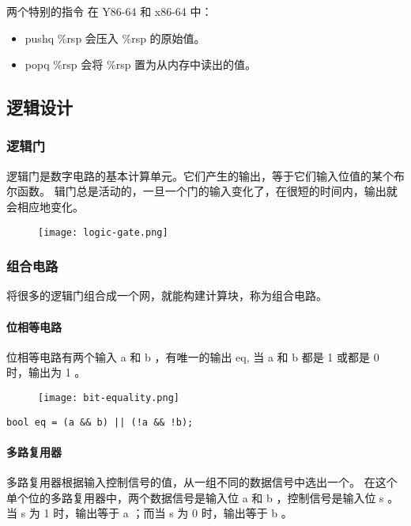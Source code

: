 \begin{sidenote}{两个特别的指令}
    在 Y86-64 和 x86-64 中：
    \begin{itemize}
        \item pushq \%rsp 会压入 \%rsp 的原始值。
        \item popq \%rsp 会将 \%rsp 置为从内存中读出的值。
    \end{itemize}
\end{sidenote}

\subsection{逻辑设计}

\subsubsection{逻辑门}
逻辑门是数字电路的基本计算单元。它们产生的输出，等于它们输入位值的某个布尔函数。
辑门总是活动的，一旦一个门的输入变化了，在很短的时间内，输出就会相应地变化。
\begin{figure}[H]
    \centering
    \texttt{[image: logic-gate.png]}
\end{figure}
\subsubsection{组合电路}

将很多的逻辑门组合成一个网，就能构建计算块，称为组合电路。

\paragraph{位相等电路}

位相等电路有两个输入 a 和 b ，有唯一的输出 eq, 当 a 和 b 都是 1 或都是 0 时，输出为 1 。

\begin{figure}[H]
    \centering
    \texttt{[image: bit-equality.png]}
\end{figure}
\begin{lstlisting}[style=CStyle]
bool eq = (a && b) || (!a && !b);
\end{lstlisting}

\paragraph{多路复用器}
多路复用器根据输入控制信号的值，从一组不同的数据信号中选出一个。
在这个单个位的多路复用器中，两个数据信号是输入位 a 和 b ，控制信号是输入位 s 。
当 s 为 1 时，输出等于 a ；而当 s 为 0 时，输出等于 b 。

